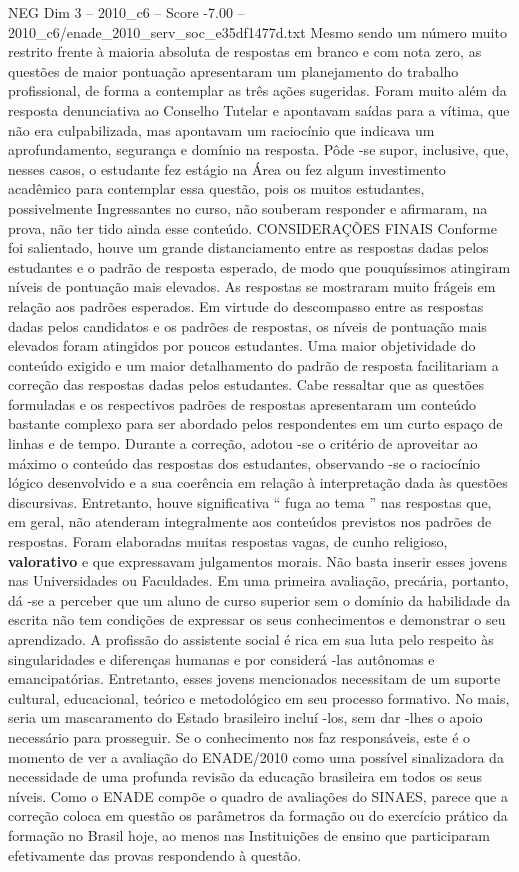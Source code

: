 \begin{textsample}{NEG Dim 3 – 2010\_c6 – Score -7.00 – 2010\_c6/enade\_2010\_serv\_soc\_e35df1477d.txt}
Mesmo sendo um número muito restrito frente à maioria absoluta de respostas em branco e com nota zero, as questões de maior pontuação apresentaram um planejamento do trabalho profissional, de forma a contemplar as três ações sugeridas.
Foram muito além da resposta denunciativa ao Conselho Tutelar e apontavam saídas para a vítima, que não era culpabilizada, mas apontavam um raciocínio que indicava um aprofundamento, segurança e domínio na resposta.
Pôde -se supor, inclusive, que, nesses casos, o estudante fez estágio na Área ou fez algum investimento acadêmico para contemplar essa questão, pois os muitos estudantes, possivelmente Ingressantes no curso, não souberam responder e afirmaram, na prova, não ter tido ainda esse conteúdo.
CONSIDERAÇÕES FINAIS Conforme foi salientado, houve um grande distanciamento entre as respostas dadas pelos estudantes e o padrão de resposta esperado, de modo que pouquíssimos atingiram níveis de pontuação mais elevados.
As respostas se mostraram muito frágeis em relação aos padrões esperados.
Em virtude do descompasso entre as respostas dadas pelos candidatos e os padrões de respostas, os níveis de pontuação mais elevados foram atingidos por poucos estudantes.
Uma maior objetividade do conteúdo exigido e um maior detalhamento do padrão de resposta facilitariam a correção das respostas dadas pelos estudantes.
Cabe ressaltar que as questões formuladas e os respectivos padrões de respostas apresentaram um conteúdo bastante complexo para ser abordado pelos respondentes em um curto espaço de linhas e de tempo.
Durante a correção, adotou -se o critério de aproveitar ao máximo o conteúdo das respostas dos estudantes, observando -se o raciocínio lógico desenvolvido e a sua coerência em relação à interpretação dada às questões discursivas.
Entretanto, houve significativa “ fuga ao tema ” nas respostas que, em geral, não atenderam integralmente aos conteúdos previstos nos padrões de respostas.
Foram elaboradas muitas respostas vagas, de cunho religioso, \textbf{valorativo} e que expressavam julgamentos morais.
Não basta inserir esses jovens nas Universidades ou Faculdades.
Em uma primeira avaliação, precária, portanto, dá -se a perceber que um aluno de curso superior sem o domínio da habilidade da escrita não tem condições de expressar os seus conhecimentos e demonstrar o seu aprendizado.
A profissão do assistente social é rica em sua luta pelo respeito às singularidades e diferenças humanas e por considerá -las autônomas e emancipatórias.
Entretanto, esses jovens mencionados necessitam de um suporte cultural, educacional, teórico e metodológico em seu processo formativo.
No mais, seria um mascaramento do Estado brasileiro incluí -los, sem dar -lhes o apoio necessário para prosseguir.
Se o conhecimento nos faz responsáveis, este é o momento de ver a avaliação do ENADE/2010 como uma possível sinalizadora da necessidade de uma profunda revisão da educação brasileira em todos os seus níveis.
Como o ENADE compõe o quadro de avaliações do SINAES, parece que a correção coloca em questão os parâmetros da formação ou do exercício prático da formação no Brasil hoje, ao menos nas Instituições de ensino que participaram efetivamente das provas respondendo à questão.


\end{textsample}
